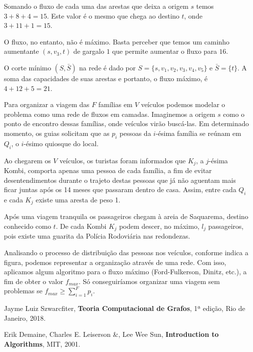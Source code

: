 \documentclass{homework}
\begin{document}
	\quest %

	\subsubquest Somando o fluxo de cada uma das arestas que deixa a origem $s$ temos $3 + 8 + 4 = 15$. Este valor é o mesmo que chega ao destino $t$, onde $3 + 11 + 1 = 15$.\par
	
	\begin{fig}
		
	\end{fig}

	O fluxo, no entanto, não é máximo. Basta perceber que temos um caminho aumentante $(s, v_3, t)$ de gargalo $1$ que permite aumentar o fluxo para $16$.\par
	
	\subsubquest O corte mínimo $(S, \bar{S})$ na rede é dado por $S = \{s, v_1, v_2, v_3, v_4, v_5\}$ e $\bar{S} = \{t\}$. A soma das capacidades de suas arestas e portanto, o fluxo máximo, é $4 + 12 + 5 = 21$.
	
	\begin{fig}
		
	\end{fig}
	
	\quest %
	
	Para organizar a viagem das $F$ famílias em $V$ veículos podemos modelar o problema como uma rede de fluxos em camadas. Imaginemos a origem $s$ como o ponto de encontro dessas famílias, onde veículos virão buscá-las. Em determinado momento, os guias solicitam que as $p_i$ pessoas da $i$-ésima família se reúnam em $Q_i$, o $i$-ésimo quiosque do local.
	
	\begin{fig}
		
	\end{fig}

	Ao chegarem os $V$ veículos, os turistas foram informados que $K_j$, a $j$-ésima Kombi, comporta apenas uma pessoa de cada família, a fim de evitar desentendimentos durante o trajeto destas pessoas que já não aguentam mais ficar juntas após os 14 meses que passaram dentro de casa. Assim, entre cada $Q_i$ e cada $K_j$ existe uma aresta de peso 1.\par

	Após uma viagem tranquila os passageiros chegam à areia de Saquarema, destino conhecido como $t$. De cada Kombi $K_j$ podem descer, no máximo, $l_j$ passageiros, pois existe uma guarita da Polícia Rodoviária nas redondezas.\par
	
	Analisando o processo de distribuição das pessoas nos veículos, conforme indica a figura, podemos representar a organização através de uma rede. Com isso, aplicamos algum algoritmo para o fluxo máximo (Ford-Fulkerson, Dinitz, etc.), a fim de obter o valor $f_{max}$. Só conseguiríamos organizar uma viagem sem problemas se $f_{max} \ge \sum_{i=1}^{F} p_i$.\par
	
	
	\begin{thebibliography}{10}
		 Jayme Luiz Szwarcfiter, \textbf{Teoria Computacional de Grafos}, 1ª edição, Rio de Janeiro, 2018.
		
		 Erik Demaine, Charles E. Leiserson \&, Lee Wee Sun, \textbf{Introduction to Algorithms}, MIT, 2001. 
	\end{thebibliography}
\end{document}
